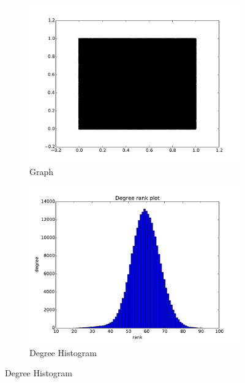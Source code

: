 \documentclass[oneside, titlepage]{scrartcl}
\begin{document}
\begin{figure}[!h]
\centering
\begin{subfigure}{0.5\textwidth}
	\centering
	\includegraphics[width=0.9\linewidth]{figures/graph11.pdf}
	\caption{Graph}
\end{subfigure}%
\begin{subfigure}{0.5\textwidth}
	\centering
	\includegraphics[width=0.9\linewidth]{figures/degrees11.pdf}
	\caption{Degree Histogram}
\end{subfigure}


\end{figure}
\end{document}
